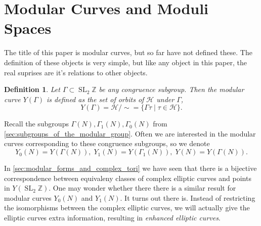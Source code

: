 \documentclass[a4paper]{article}
\theoremstyle{theoremdd}
\theoremstyle{definitiondd}
\newtheorem{definition}[theorem]{Definition}
\theoremstyle{remarkdd}
\newcommand{\Z}{\mathbb{Z}}
\DeclareMathOperator{\SL}{SL}
\begin{document}
\section{Modular Curves and Moduli Spaces} \label{sec:modular_curves_and_moduli_spaces}
The title of this paper is modular curves, but so far have not defined these. 
The definition of these objects is very simple, but like any object in this paper, the real suprises are it's relations to other objects. 
\begin{definition}
	Let $\Gamma \subset \SL_2\Z$ be any congruence subgroup. Then the \emph{modular curve} $Y(\Gamma)$ is defined as the set of orbits of $\mathcal{H} $ under  $\Gamma$, \[
		Y(\Gamma) = \mathcal{H} / \sim = \{\Gamma \tau \;|\; \tau \in \mathcal{H} \} 
	.\] 
\end{definition}
Recall the subgroups $\Gamma(N), \Gamma_1(N), \Gamma_0(N)$ from \cref{sec:subgroups_of_the_modular_group}. 
Often we are interested in the modular curves corresponding to these congruence subgroups, so we denote \[
	Y_0(N) = Y(\Gamma(N)),\; Y_1(N) = Y(\Gamma_1(N)),\; Y(N) = Y(\Gamma(N))
.\]  
 
In \cref{sec:modular_forms_and_complex_tori} we have seen that there is a bijective correspondence between equivaleny classes of complex elliptic curves and points in $Y (\SL_2\Z)$. 
One may wonder whether there there is a similar result for modular curves $Y_0(N)$ and $Y_1(N)$.
It turns out there is. 
Instead of restricting the isomorphisms between the complex elliptic curves, we will actually give the elliptic curves extra information, resulting in \emph{enhanced elliptic curves}. 
\end{document}
